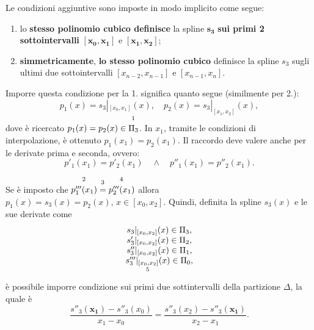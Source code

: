 Le condizioni aggiuntive sono imposte in modo implicito come segue:
\begin{enumerate}
    \item lo \textbf{stesso polinomio cubico definisce} la spline $\boldsymbol{s_3}$ \textbf{sui primi 2 sottointervalli} $\boldsymbol{[x_0,x_1]}$ e $\boldsymbol{[x_1,x_2]}$;
    \item \footnotemark \textbf{simmetricamente}, \textbf{lo stesso polinomio cubico} definisce la spline $s_3$ sugli ultimi due sottointervalli $[x_{n-2},x_{n-1}]$ e $[x_{n-1},x_n]$.
\end{enumerate}

Imporre questa condizione per la 1. significa quanto segue (similmente per 2.):
\begin{equation*}
    p_1(x)=s_3|_{[x_0,x_1]}(x),\quad p_2(x)=s_3|_{[x_1,x_2]}(x),
\end{equation*}
dove è ricercato $p_1(x)=p_2(x)\in\overset{\footnotemark}{\Pi_3}$. In $x_1$, tramite le condizioni di interpolazione, è ottenuto $p_1(x_1)=p_2(x_1)$. Il raccordo deve valere anche per le derivate prima e seconda, ovvero:
\begin{equation*}
    p'_1(x_1)=p'_2(x_1)\quad\land\quad p''_1(x_1)=p''_2(x_1).
\end{equation*}

Se è imposto che $\overset{\footnotemark}{p'''_1(x_1)}\overset{\footnotemark}{=}\overset{\footnotemark}{p'''_2(x_1)}$ allora $p_1(x)=s_3(x)=p_2(x),\, x\in [x_0,x_2]$. Quindi, definita la spline $s_3(x)$ e le sue derivate come 
\begin{equation*}
    \begin{matrix}
        s_3|_{[x_0,x_2]}(x)\in\Pi_3,\\
        s'_3|_{[x_0,x_2]}(x)\in\Pi_2,\\
        s''_3|_{[x_0,x_2]}(x)\in\Pi_1,\\
        \underset{\footnotemark}{s'''_3|_{[x_0,x_2]}(x)}\in\Pi_0,
    \end{matrix}
\end{equation*}
è possibile imporre condizione sui primi due sottintervalli della partizione $\Delta$, la quale è
\begin{equation*}
    \boxed{\frac{s''_3(\boldsymbol{x_1})-s''_3(x_0)}{x_1-x_0}=\frac{s''_3(x_2)-s''_3(\boldsymbol{x_1})}{x_2-x_1}.}
\end{equation*}

